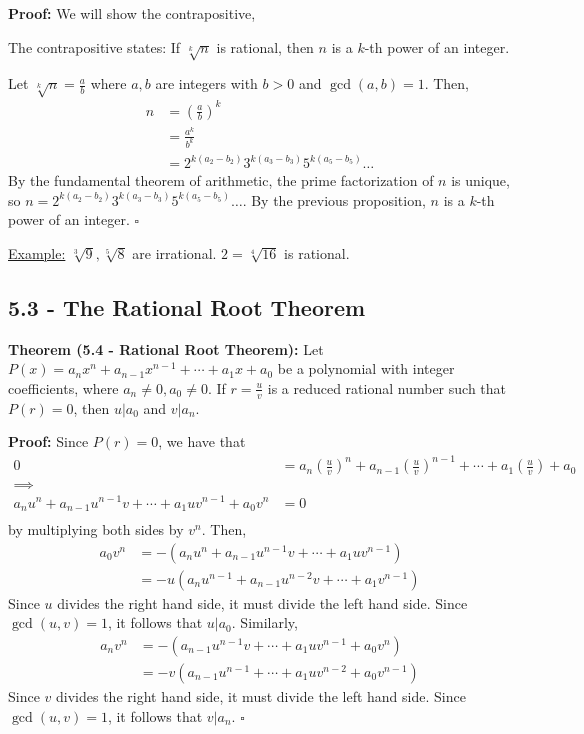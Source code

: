\documentclass{article}
\newcommand*{\qed}{\hfill$\square$}%
\newenvironment{aside}{\begin{siderules}\setlength{\leftskip}{0.3cm}}{\end{siderules}\setlength{\leftskip}{0pt}}
\begin{document}
\textbf{Proof:} We will show the contrapositive, 

\begin{aside}
The contrapositive states: If $\sqrt[k]{n}$ is rational, then $n$ is a $k$-th power of an integer.
\end{aside}

Let $\sqrt[k]{n}=\frac{a}{b}$ where $a,b$ are integers with $b>0$ and $\gcd(a,b)=1$. Then, \begin{align*}
    n&=\left(\frac{a}{b}\right)^k \\
     &= \frac{a^k}{b^k} \\
     &= 2^{k(a_2-b_2)}3^{k(a_3-b_3)}5^{k(a_5-b_5)}\dots
\end{align*}By the fundamental theorem of arithmetic, the prime factorization of $n$ is unique, so $n=2^{k(a_2-b_2)}3^{k(a_3-b_3)}5^{k(a_5-b_5)}\dots$. By the previous proposition, $n$ is a $k$-th power of an integer. \qed

\underline{Example:} $\sqrt[3]{9}, \sqrt[5]{8}$ are irrational. $2=\sqrt[4]{16}$ is rational. 

\subsection{5.3 - The Rational Root Theorem}

\textbf{Theorem (5.4 - Rational Root Theorem):} Let $P(x)=a_nx^n+a_{n-1}x^{n-1}+\cdots + a_1x + a_0$ be a polynomial with integer coefficients, where $a_n\neq 0, a_0\neq 0$. If $r=\frac{u}{v}$ is a reduced rational number such that $P(r)=0$, then $u|a_0$ and $v|a_n$.

\textbf{Proof:} Since $P(r)=0$, we have that \begin{align*}
    0&=a_n(\frac{u}{v})^n + a_{n-1}(\frac{u}{v})^{n-1} + \cdots + a_1(\frac{u}{v}) + a_0 \\
    \implies \\
    a_nu^n+a_{n-1}u^{n-1}v + \cdots + a_1uv^{n-1} + a_0v^n &= 0 \\
\end{align*}by multiplying both sides by $v^n$. Then, \begin{align*}
    a_0v^n&=-(a_nu^n+a_{n-1}u^{n-1}v + \cdots + a_1uv^{n-1}) \\
           &=-u(a_nu^{n-1}+a_{n-1}u^{n-2}v + \cdots + a_1v^{n-1})
\end{align*}Since $u$ divides the right hand side, it must divide the left hand side. Since $\gcd(u,v)=1$, it follows that $u|a_0$. Similarly, \begin{align*}
    a_nv^n&=-(a_{n-1}u^{n-1}v + \cdots + a_1uv^{n-1} + a_0v^n) \\
           &=-v(a_{n-1}u^{n-1} + \cdots + a_1u v^{n-2} + a_0v^{n-1})
\end{align*}Since $v$ divides the right hand side, it must divide the left hand side. Since $\gcd(u,v)=1$, it follows that $v|a_n$. \qed
\end{document}
